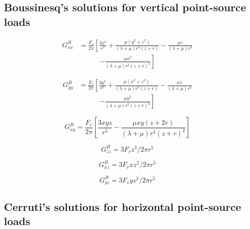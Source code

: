 \documentclass[twocolumn,jgrga]{AGUTeX}
\begin{document}
\begin{article}
{{{\subsection{Boussinesq's solutions for vertical point-source
loads}\label{boussinesqs-solutions-for-vertical-point-source-loads}

\begin{equation}
\begin{split}
G_{xx}^B & = \frac{ F_v }{ 2\pi } \left[ \frac{ 3x^2 }{ r^5 } \right.
+ \frac{\mu (y^2 + z^2)}{(\lambda + \mu) r^3 (z + r)}
- \frac{\mu z}{(\lambda + \mu) r^3} \\
&\qquad \quad \left. - \frac{\mu x^2}{ (\lambda + \mu) r^2 (z + r)^2 }\right ]
\end{split}
\end{equation}

\begin{equation}
\begin{split}
G_{yy}^B & = \frac{F_v}{2\pi } \left [ \frac{3y^2}{r^5} \right.
+ \frac{\mu (x^{2} + z^{2})}{(\lambda + \mu) r^{3}(z + r)}
- \frac{\mu z}{(\lambda + \mu) r ^{3}} \\
& \qquad \quad \left. - \frac{\mu y^{2}}{(\lambda + \mu ) r^2 (z +r)^2} \right]
\end{split}
\end{equation}

\begin{equation}
G_{xy}^{B} = \frac{F _{v}}{2\pi} \left[ \frac{3xyz}{r^{5}}
- \frac{\mu x y (z + 2r)}{(\lambda + \mu) r^{3} (z + r)^{2}} \right]
\end{equation}

\begin{equation}
G_{zz}^{B} = 3 F _{v} z^{3} / 2 \pi r^{5}
\end{equation}

\begin{equation}
G_{xz}^{B} = 3 F _{v} xz^{2} / 2 \pi r^{5}
\end{equation}

\begin{equation}
G_{yz}^{B} = 3 F _{v} yz^{2} / 2 \pi r^{5}
\end{equation}

\subsection{Cerruti's solutions for horizontal point-source
loads}\label{cerrutis-solutions-for-horizontal-point-source-loads}

}}}
\end{article}
\end{document}
